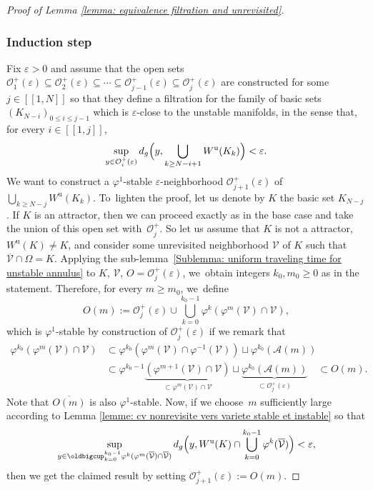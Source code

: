 \documentclass[JEP,XML,SOM,Unicode,NoEqCountersInSection,NoFloatCountersInSection,published]{cedram}
\newcommand{\lcr}{[\![}
\newcommand{\rcr}{]\!]}
\newcommand{\ru}{\mathrm{u}}
\theoremstyle{definition}
\theoremstyle{plain}
\newcommand{\Acal}{\mathcal{A}}
\newcommand{\Ocal}{\mathcal{O}}
\newcommand{\Vcal}{\mathcal{V}}
\begin{document}
\begin{proof}[Proof of Lemma \ref{lemma: equivalence filtration and unrevisited}]
\subsubsection*{Induction step}
Fix $\varepsilon > 0$ and assume that the open sets $\Ocal_1^+ (\varepsilon) \subseteq \Ocal_2^+ (\varepsilon) \subseteq \cdots \subseteq \Ocal_{j-1}^+ (\varepsilon) \subseteq \Ocal_j^+ (\varepsilon)$ are constructed for some $j\in\lcr1,N\rcr$ so that they define a filtration for the family of basic sets $(K_{N-i})_{0 \leq i \leq j-1}$ which is $\varepsilon$-close to the unstable manifolds, in the sense that, for every $i\in\lcr1,j\rcr$,
\[
\sup_{y \in \Ocal_i^+ (\varepsilon)} d_g \Bigl(y, \bigcup_{k \geq N- i +1} W^\ru (K_{k}) \Bigr) < \varepsilon.
\]
We want to construct a $\varphi^1$-stable $\varepsilon$-neighborhood $\Ocal_{j+1}^+ (\varepsilon)$ of $\bigcup_{k \geq N-j} W^\ru (K_{k})$. To~lighten the proof, let us denote by $K$ the basic set $K_{N-j}$. If $K$ is an attractor, then we can proceed exactly as in the base case and take the union of this open set with~$\mathcal{O}_{j}^+$. So let us assume that $K$ is not a attractor, \ie $W^\ru (K) \neq K$, and consider some unrevisited neighborhood $\Vcal$ of $K$ such that $\overline{\Vcal} \cap \Omega = K$. Applying the sub-lemma~\ref{Sublemma: uniform traveling time for unstable annulus} to $K$, $\Vcal$, $O = \Ocal_j^+ (\varepsilon)$, we~obtain integers $k_0, m_0 \geq 0$ as in the statement. Therefore, for every $m \geq m_0$, we~define
\[
O (m):= \Ocal_j^+ (\varepsilon) \cup \bigcup_{k = 0}^{k_0 - 1} \varphi^{k} (\varphi^{m} (\Vcal) \cap \Vcal),
\]
which is $\varphi^1$-stable by construction of $\Ocal_j^+ (\varepsilon)$ if we remark that
\begin{align*}
\varphi^{k_0} (\varphi^{m} (\Vcal) \cap \Vcal) &\subset \varphi^{ k_0} \left(\varphi^{m} (\Vcal) \cap \varphi^{-1} (\Vcal)\right) \sqcup \varphi^{k_0}\left(\Acal (m)\right) \\
&\subset \varphi^{ k_0 - 1} \underbrace{\left(\varphi^{m+1} (\Vcal) \cap \Vcal \right)}_{\subset \varphi^{m} (\Vcal) \cap \Vcal} \sqcup \underbrace{\varphi^{k_0}\left(\Acal (m)\right)}_{\subset \Ocal_j^+ (\varepsilon)} \quad \subset O (m).
\end{align*}
Note that $\overline{O (m)}$ is also $\varphi^1$-stable. Now, if we choose~$m$ sufficiently large according to Lemma \ref{lemme: cv nonrevisite vers variete stable et instable} so that
\[
\sup_{y \in \oldbigcup_{k = 0}^{k_0 - 1} \varphi^{k} (\varphi^{m} (\overline{\Vcal}) \cap \overline{\Vcal})}d_g \Bigl(y, W^\ru (K) \cap \bigcup_{k = 0}^{k_0 - 1} \varphi^k (\overline{\Vcal}) \Bigr) < \varepsilon,
\]
then we get the claimed result by setting $\Ocal_{j+1}^+ (\varepsilon):= O (m)$.
\end{proof}
\end{document}
